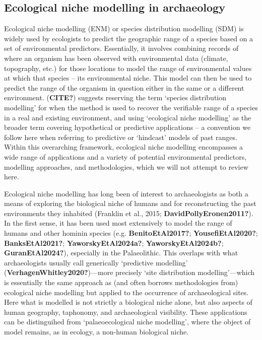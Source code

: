 \documentclass[
  number,
  review]{elsarticle}
\begin{document}
\subsection{Ecological niche modelling in
archaeology}\label{ecological-niche-modelling-in-archaeology}

Ecological niche modelling (ENM) or species distribution modelling (SDM)
is widely used by ecologists to predict the geographic range of a
species based on a set of environmental predictors. Essentially, it
involves combining records of where an organism has been observed with
environmental data (climate, topography, etc.) for those locations to
model the range of environmental values at which that species -- its
environmental niche. This model can then be used to predict the range of
the organism in question either in the same or a different environment.
(\textbf{CITE?}) suggests reserving the term `species distribution
modelling' for when the method is used to recover the verifiable range
of a species in a real and existing environment, and using `ecological
niche modelling' as the broader term covering hypothetical or predictive
applications -- a convention we follow here when referring to predictive
or `hindcast' models of past ranges. Within this overarching framework,
ecological niche modelling encompasses a wide range of applications and
a variety of potential environmental predictors, modelling approaches,
and methodologies, which we will not attempt to review here.

Ecological niche modelling has long been of interest to archaeologists
as both a means of exploring the biological niche of humans and for
reconstructing the past environments they inhabited (Franklin et al.,
2015; \textbf{DavidPollyEronen2011?}). In the first sense, it has been
used most extensively to model the range of humans and other hominin
species (e.g. \textbf{BenitoEtAl2017?}; \textbf{YousefiEtAl2020?};
\textbf{BanksEtAl2021?}; \textbf{YaworskyEtAl2024a?};
\textbf{YaworskyEtAl2024b?}; \textbf{GuranEtAl2024?}), especially in the
Palaeolithic. This overlaps with what archaeologists usually call
generically `predictive modelling'
(\textbf{VerhagenWhitley2020?})---more precisely `site distribution
modelling'---which is essentially the same approach as (and often
borrows methodologies from) ecological niche modelling but applied to
the occurrence of archaeological sites. Here what is modelled is not
strictly a biological niche alone, but also aspects of human geography,
taphonomy, and archaeological visibility. These applications can be
distinguihed from `palaeoecological niche modelling', where the object
of model remains, as in ecology, a non-human biological niche.
\end{document}

